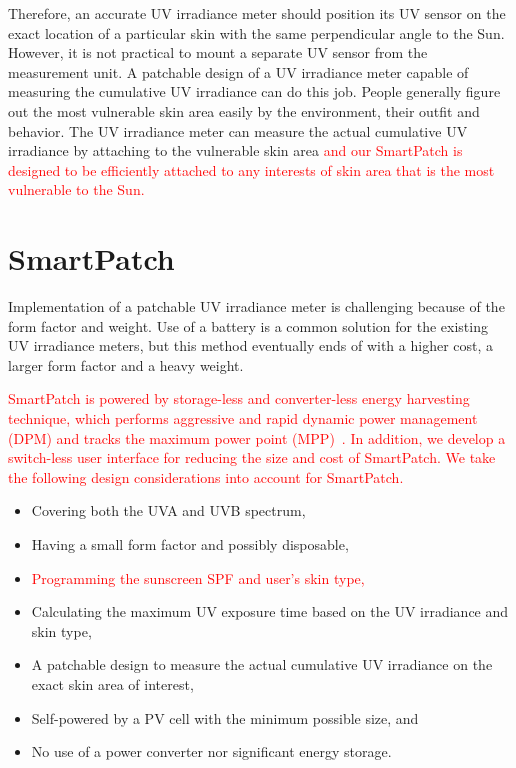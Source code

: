 \documentclass[journal]{IEEEtran}
\begin{document}
Therefore, an accurate UV irradiance meter should position its UV sensor on the exact location of a particular skin with the same perpendicular angle to the Sun. However, it is not practical to mount a separate UV sensor from the measurement unit. A patchable design of a UV irradiance meter capable of measuring the cumulative UV irradiance can do this job. People generally figure out the most vulnerable skin area easily by the environment, their outfit and behavior. The UV irradiance meter can measure the actual cumulative UV irradiance by attaching to the vulnerable skin area \textcolor{red}{and our SmartPatch is designed to be efficiently attached to any interests of skin area that is the most vulnerable to the Sun.}

\section{SmartPatch}

Implementation of a patchable UV irradiance meter is challenging because of the form factor and weight.
Use of a battery is a common solution for the existing UV irradiance meters, but this method eventually ends of with a higher cost, a larger form factor and a heavy weight.

\textcolor{red}{SmartPatch is powered by storage-less and converter-less energy harvesting technique, which performs aggressive and rapid dynamic power management (DPM) and tracks the maximum power point (MPP)~\cite{Wang:ASPDAC14}. In addition, we develop a switch-less user interface for reducing the size and cost of SmartPatch. We take the following design considerations into account for SmartPatch.}

\begin{itemize}
\item Covering both the UVA and UVB spectrum,
\item Having a small form factor and possibly disposable,
\item \textcolor{red}{Programming the sunscreen SPF and user's skin type,}
\item Calculating the maximum UV exposure time based on the UV irradiance and skin type,
\item A patchable design to measure the actual cumulative UV irradiance on the exact skin area of interest,
\item Self-powered by a PV cell with the minimum possible size, and
\item No use of a power converter nor significant energy storage.
\end{itemize}
\end{document}
